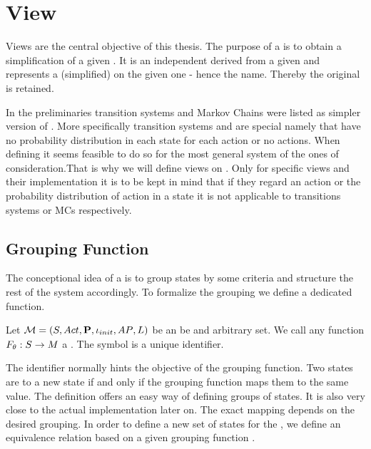 \documentclass[preview]{standalone}
\begin{document}
	
\section{View}
Views are the central objective of this thesis. The purpose of a \viewN is to obtain a simplification of a given \chosengraphtypeN.  It is an independent \chosengraphtypeN derived from a given \chosengraphtypeN and represents a (simplified) \viewN on the given one - hence the name. Thereby the original \chosengraphtypeN is retained.

In the preliminaries transition systems and Markov Chains were listed as simpler version of \mdpsN. More specifically transition systems and \mdpsN are special \mdpsN namely that have no probability distribution in each state for each action or no actions. When defining \viewsN it seems feasible to do so for the most general system of the ones of consideration.That is why we will define views on \mdpsN. Only for specific views and their implementation it is to be kept in mind that if they regard an action or the probability distribution of action in a state it is not applicable to transitions systems or MCs respectively. 

\subsection{Grouping Function}
The conceptional idea of a \viewN is to group states by some criteria and structure the rest of the system accordingly. To formalize the grouping we define a dedicated function.

\begin{definition}
	Let ${{{\mathcal{M}}}} = {{({S}, {Act}, {\textbf{P}}, {\iota_{init}}, {AP}, {L})}}$ be \chosengraphtypeN an \arbset be and arbitrary set. We call any function ${F_{{\theta}}} : {S} \to {\ensuremath{{M}}}$ a \emph{\grpfctN}. The symbol \viewppty is a unique identifier.
	
	\label{def:grpfct}
\end{definition}

The identifier \viewppty normally hints the objective of the grouping function. Two states are  to a new state if and only if the grouping function maps them to the same value. The definition offers an easy way of defining groups of states. It is also very close to the actual implementation later on. The exact mapping depends on the desired grouping. In order to define a new set of states for the \viewN, we define an equivalence relation \eqrelview based on a given grouping function \grpfct.
\end{document}
